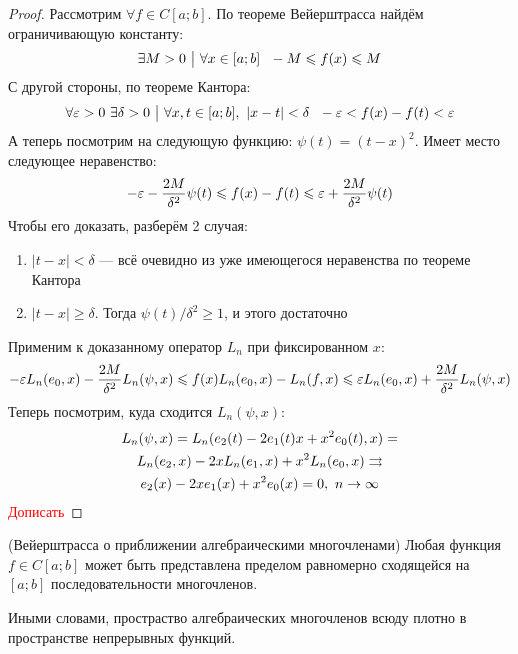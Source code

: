 \begin{proof}
	Рассмотрим $\forall f \in C[a; b]$. По теореме Вейерштрасса найдём ограничивающую константу:
	\[
		\exists M > 0 \ \big|\  \forall x \in [a; b]\ \ -M \leqslant f(x) \leqslant M
	\]
	С другой стороны, по теореме Кантора:
	\[
		\forall \varepsilon > 0\ \exists \delta > 0 \ \big|\  \forall x, t \in [a; b],\ |x - t| < \delta\ \ -\varepsilon < f(x) - f(t) < \varepsilon
	\]
	А теперь посмотрим на следующую функцию: $\psi(t) = (t - x)^2$. Имеет место следующее неравенство:
	\[
		-\varepsilon - \frac{2M}{\delta^2}\psi(t) \leqslant f(x) - f(t) \leqslant \varepsilon + \frac{2M}{\delta^2}\psi(t)
	\]
	Чтобы его доказать, разберём 2 случая:
	\begin{enumerate}
		\item $|t - x| < \delta$ --- всё очевидно из уже имеющегося неравенства по теореме Кантора
		
		\item $|t - x| \ge \delta$. Тогда $\psi(t) / \delta^2 \ge 1$, и этого достаточно
	\end{enumerate}
	Применим к доказанному оператор $L_n$ при фиксированном $x$:
	\[
		-\varepsilon L_n(e_0, x) - \frac{2M}{\delta^2}L_n(\psi, x) \leqslant f(x)L_n(e_0, x) - L_n(f, x) \leqslant \varepsilon L_n(e_0, x) + \frac{2M}{\delta^2}L_n(\psi, x)
	\]
	Теперь посмотрим, куда сходится $L_n(\psi, x)$:
	\begin{multline*}
		L_n(\psi, x) = L_n(e_2(t) - 2e_1(t)x + x^2e_0(t), x) =
		\\
		L_n(e_2, x) - 2xL_n(e_1, x) + x^2 L_n(e_0, x) \rightrightarrows
		\\
		e_2(x) - 2xe_1(x) +x^2e_0(x) = 0,\ n \to \infty
	\end{multline*}
	\textcolor{red}{Дописать}
\end{proof}

\begin{theorem} (Вейерштрасса о приближении алгебраическими многочленами)
	Любая функция $f \in C[a; b]$ может быть представлена пределом равномерно сходящейся на $[a; b]$ последовательности многочленов.
\end{theorem}

\begin{note}
	Иными словами, простраство алгебраических многочленов всюду плотно в пространстве непрерывных функций.
\end{note}

